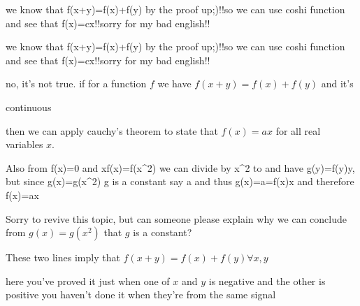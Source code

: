 \begin{solution}
	we know that f(x+y)=f(x)+f(y) by the proof up;)!!so we can use coshi function and see that f(x)=cx!!sorry for my bad english!!
\end{solution}



\begin{solution}
	\begin{tcolorbox}we know that f(x+y)=f(x)+f(y) by the proof up;)!!so we can use coshi function and see that f(x)=cx!!sorry for my bad english!!\end{tcolorbox}

no, it's not true. if for a function $f$ we have $f(x+y)=f(x)+f(y)$ and it's \begin{bolded}continuous\end{bolded} then we can apply cauchy's theorem to state that $f(x)=ax$ for all real variables $x$.
\end{solution}



\begin{solution}
	Also from f(x)=0 and xf(x)=f(x^2) we can divide by x^2 to and have g(y)=f(y)\/y, but since g(x)=g(x^2) g is a constant say a and thus g(x)=a=f(x)\/x and therefore f(x)=ax
\end{solution}



\begin{solution}
	Sorry to revive this topic, but can someone please explain why we can conclude from $ g(x) = g(x^2)$ that $ g $ is a constant?
\end{solution}



\begin{solution}
	These two lines imply that $ f(x+y)=f(x)+f(y) \forall x,y $

here you've proved it just when one of $ x $ and $ y $ is negative and the other is positive
you haven't done it when they're from the same signal
\end{solution}



